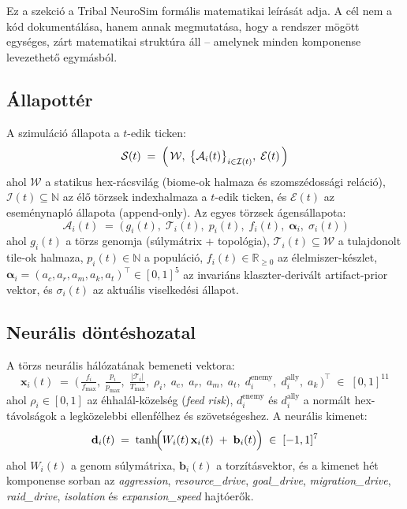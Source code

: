 ﻿\documentclass[a4paper,12pt]{report}
\begin{document}
Ez a szekció a Tribal NeuroSim formális matematikai leírását adja. A cél nem a kód dokumentálása,
hanem annak megmutatása, hogy a rendszer mögött egységes, zárt matematikai struktúra áll --
amelynek minden komponense levezethető egymásból.

\subsection*{Állapottér}

A szimuláció állapota a $t$-edik ticken:
\begin{equation}
\mathcal{S}(t) \;=\; \Bigl(\, \mathcal{W},\;\bigl\{\mathcal{A}_i(t)\bigr\}_{i \in \mathcal{I}(t)},\;\mathcal{E}(t) \,\Bigr)
\end{equation}
ahol $\mathcal{W}$ a statikus hex-rácsvilág (biome-ok halmaza és szomszédossági reláció),
$\mathcal{I}(t) \subseteq \mathbb{N}$ az élő törzsek indexhalmaza a $t$-edik ticken,
és $\mathcal{E}(t)$ az eseménynapló állapota (append-only). Az egyes törzsek ágensállapota:
\begin{equation}
\mathcal{A}_i(t) \;=\; \bigl(\, g_i(t),\;\mathcal{T}_i(t),\; p_i(t),\; f_i(t),\;\boldsymbol{\alpha}_i,\;\sigma_i(t) \,\bigr)
\end{equation}
ahol $g_i(t)$ a törzs genomja (súlymátrix + topológia), $\mathcal{T}_i(t) \subseteq \mathcal{W}$
a tulajdonolt tile-ok halmaza, $p_i(t) \in \mathbb{N}$ a populáció, $f_i(t) \in \mathbb{R}_{\geq 0}$
az élelmiszer-készlet, $\boldsymbol{\alpha}_i = (a_c, a_r, a_m, a_k, a_t)^{\!\top} \in [0,1]^5$
az invariáns klaszter-derivált artifact-prior vektor, és $\sigma_i(t)$ az aktuális viselkedési
állapot.

\subsection*{Neurális döntéshozatal}

A törzs neurális hálózatának bemeneti vektora:
\begin{equation}
\mathbf{x}_i(t) \;=\; \bigl(\,
  \tfrac{f_i}{f_{\max}},\;
  \tfrac{p_i}{p_{\max}},\;
  \tfrac{|\mathcal{T}_i|}{T_{\max}},\;
  \rho_i,\;
  a_c,\; a_r,\; a_m,\; a_t,\;
  d^{\text{enemy}}_i,\; d^{\text{ally}}_i,\;
  a_k
\,\bigr)^{\!\top} \;\in\; [0,1]^{11}
\end{equation}
ahol $\rho_i \in [0,1]$ az éhhalál-közelség (\textit{feed risk}), $d^{\text{enemy}}_i$ és
$d^{\text{ally}}_i$ a normált hex-távolságok a legközelebbi ellenfélhez és szövetségeshez.
A neurális kimenet:
\begin{equation}
\mathbf{d}_i(t) \;=\; \tanh\!\Bigl( W_i(t)\,\mathbf{x}_i(t) \;+\; \mathbf{b}_i(t) \Bigr)
\;\in\; [-1,1]^7
\end{equation}
ahol $W_i(t)$ a genom súlymátrixa, $\mathbf{b}_i(t)$ a torzításvektor, és a kimenet hét
komponense sorban az \textit{aggression}, \textit{resource\_drive}, \textit{goal\_drive},
\textit{migration\_drive}, \textit{raid\_drive}, \textit{isolation} és \textit{expansion\_speed}
hajtóerők.
\end{document}
